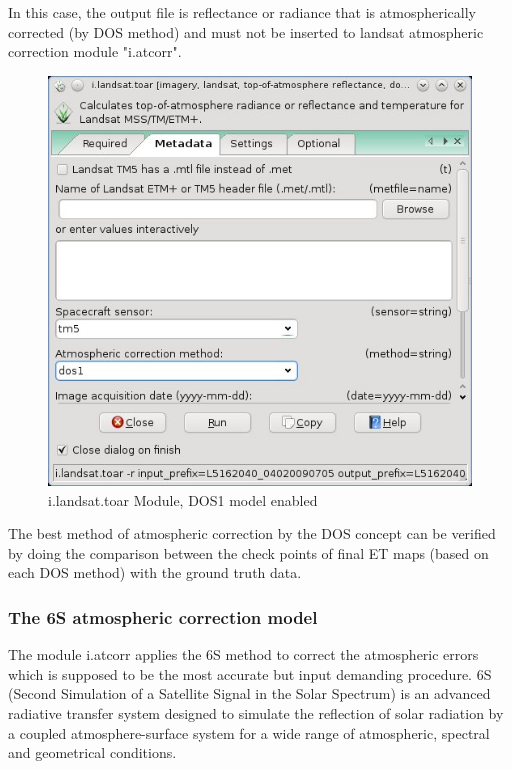 In this case, the output file is reflectance or radiance that is atmospherically corrected (by DOS method) and must not be inserted to landsat atmospheric correction module "i.atcorr". \newline

\begin{figure}[htbp]
   \centering
   \includegraphics[scale=0.4]{gipe015.png}
   \caption{i.landsat.toar Module, DOS1 model enabled}
   \label{fig:gipe015}
\end{figure}

The best method of atmospheric correction by the DOS concept can be verified by doing the comparison between the check points of final ET maps (based on each DOS method) with the ground truth data.\newline

\subsubsection{The 6S atmospheric correction model}

The module i.atcorr applies the 6S method to correct the atmospheric errors which is supposed to be the most accurate but input demanding procedure.  \newline
6S (Second Simulation of a Satellite Signal in the Solar Spectrum) is an advanced radiative transfer system designed to simulate the reflection of solar radiation by a coupled atmosphere-surface system for a wide range of atmospheric, spectral and geometrical conditions. \newline

